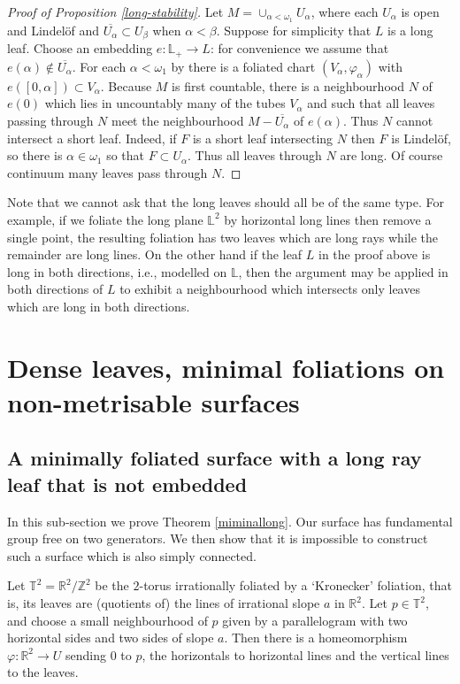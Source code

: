 \documentclass{amsart}
\begin{document}
\begin{proof}[Proof of Proposition \ref{long-stability}]
  Let $M=\cup_{\alpha<\omega_1}U_\alpha$, where each $U_\alpha$ is open and Lindel\"of and $\overline{U_\alpha}\subset U_\beta$ when $\alpha<\beta$. 
  Suppose for simplicity that $L$ is a long leaf. Choose an embedding $e:{\mathbb{L}}_+\to L$: for convenience we assume that 
  $e(\alpha)\notin\overline{U_\alpha}$. For each $\alpha<\omega_1$ by \cite[Lemma 2.3]{BGG} there is a foliated chart $(V_\alpha,\varphi_\alpha)$ with 
  $e([0,\alpha])\subset V_\alpha$. Because $M$ is first countable, there is a neighbourhood $N$ of $e(0)$ which lies in 
  uncountably many of the tubes $V_\alpha$ and such that all leaves passing through $N$ meet the neighbourhood 
  $M-\overline{U_\alpha}$ of $e(\alpha)$. Thus $N$ cannot intersect a short leaf. Indeed, if $F$ is a short leaf intersecting $N$ then $F$ is 
  Lindel\"of, so there is $\alpha\in\omega_1$ so that $F\subset U_\alpha$. 
  Thus all leaves through $N$ are long. Of course continuum many leaves pass through $N$.
\end{proof}

Note that we cannot ask that the long leaves should all be of the same type. For example, if we foliate the long plane $\mathbb L^2$ by horizontal long lines then remove a single point, the resulting foliation has two leaves which are long rays while the remainder are long lines. On the other hand if the leaf $L$ in the proof above is long in both directions, i.e., modelled on $\mathbb L$, then the argument may be applied in both directions of $L$ to exhibit a neighbourhood which intersects only leaves which are long in both directions.

\section{Dense leaves, minimal foliations on non-metrisable surfaces}\label{dense}

\subsection{A minimally foliated surface with a long ray leaf that is not embedded}\label{Mathieu's-trick}

In this sub-section we prove Theorem \ref{miminallong}. Our surface has fundamental group free on two generators. We then show that it is impossible to construct such a surface which is also simply connected.

Let ${\mathbb T}^2={\mathbb R}^2/{\mathbb Z}^2$ be the $2$-torus irrationally foliated by a `Kronecker' foliation, that is, its leaves are (quotients of) the lines of irrational slope $a$ in ${\mathbb R}^2$. Let $p\in\mathbb{T}^2$, and choose a small neighbourhood of $p$ given by a parallelogram with two horizontal sides and two sides of slope $a$. Then there is a homeomorphism $\varphi: {\mathbb R}^2\to U$ sending $0$ to $p$, the horizontals to horizontal lines and the vertical lines to the leaves.
\end{document}

